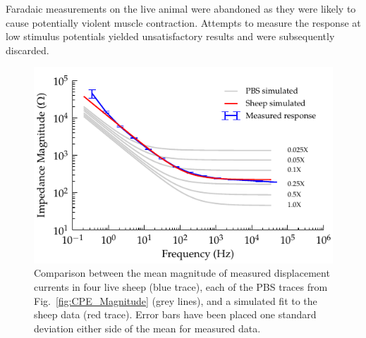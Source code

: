 \documentclass[journal, a4paper]{IEEEtran}
\begin{document}
Faradaic measurements on the live animal were abandoned as they were likely to cause potentially violent muscle contraction. Attempts to measure the response at low stimulus potentials yielded unsatisfactory results and were subsequently discarded. 

\begin{figure}
    \begin{center}
        \includegraphics{graphics/displacement-withSheep_impedanceVsFrequency_magnitude}
    \end{center}
    \caption{Comparison between the mean magnitude of measured displacement currents in four live sheep (blue trace), each of the PBS traces from Fig.~\ref{fig:CPE_Magnitude} (grey lines), and a simulated fit to the sheep data (red trace). Error bars have been placed one standard deviation either side of the mean for measured data.}
    \label{fig:displacement_sheepCPEMagnitude}
\end{figure}
\end{document}
